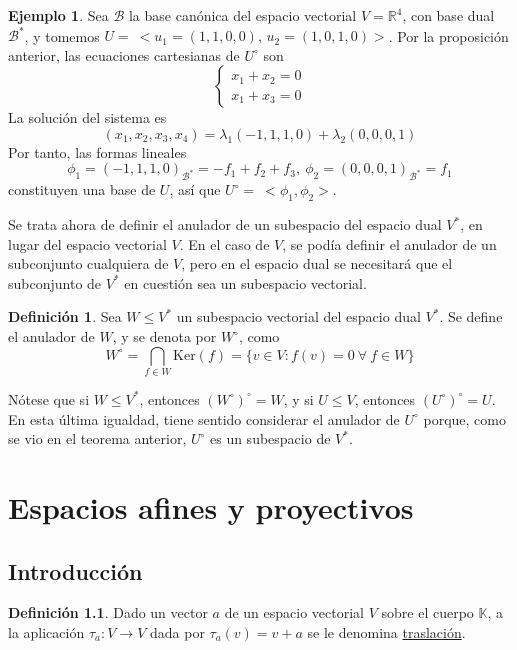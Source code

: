 \documentclass[12pt]{report}
\theoremstyle{definition}
\newtheorem{definition}{Definición}[chapter]
\theoremstyle{definition}
\newtheorem{example}{Ejemplo}[chapter]
\theoremstyle{remark}
\newcommand{\R}{\mathbb R}
\begin{document}
\begin{example}
     Sea $\mathcal{B}$ la base canónica del espacio vectorial $V=\R^4$, con base dual $\mathcal{B^*}$, y tomemos $U = \ <u_1=(1,1,0,0), \, u_2=(1,0,1,0)>$. Por la proposición anterior, las ecuaciones cartesianas de $U^\circ$ son
     \[
     \begin{cases}
         x_1+x_2=0 \\
         x_1+x_3=0
     \end{cases}
     \]
     La solución del sistema es
     \[(x_1,x_2,x_3,x_4)=\lambda_1 (-1,1,1,0)+\lambda_2(0,0,0,1)\]
     Por tanto, las formas lineales
     \[\phi_1 = (-1,1,1,0)_{\mathcal{B}^*} = -f_1+f_2+f_3, \ \phi_2 = (0,0,0,1)_{\mathcal{B}^*} = f_1\]
     constituyen una base de $U$, así que $U^\circ = \ <\phi_1,\phi_2>$.
\end{example}

Se trata ahora de definir el anulador de un subespacio del espacio dual $V^*$, en lugar del espacio vectorial $V$. En el caso de $V$, se podía definir el anulador de un subconjunto cualquiera de $V$, pero en el espacio dual se necesitará que el subconjunto de $V^*$ en cuestión sea un subespacio vectorial.

\begin{definition}
Sea $W \leq V^*$ un subespacio vectorial del espacio dual $V^*$. Se define el anulador de $W$, y se denota por $W^\circ$, como
\[W^\circ = \bigcap_{f \in W}\mathrm{Ker}(f) = \{v \in V \colon f(v) = 0 \ \forall \ f \in W\}\]
\end{definition}

Nótese que si $W \leq V^*$, entonces $(W^\circ)^\circ = W$, y si $U \leq V$, entonces $(U^\circ)^\circ = U$. En esta última igualdad, tiene sentido considerar el anulador de $U^\circ$ porque, como se vio en el teorema anterior, $U^\circ$ es un subespacio de $V^*$. 

\chapter{Espacios afines y proyectivos}

\section{Introducción}

\begin{definition}
Dado un vector $a$ de un espacio vectorial $V$ sobre el cuerpo $\mathbb{K}$, a la aplicación $\tau_a \colon V \to V$ dada por $\tau_a(v) = v+a$ se le denomina \ul{traslación}.
\end{definition}
\end{document}
